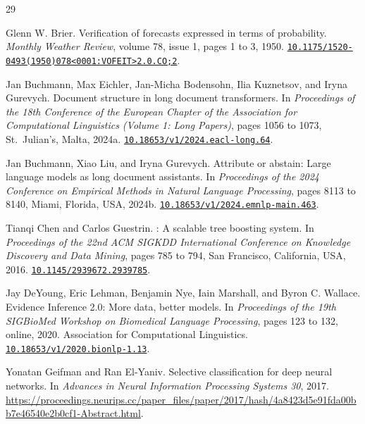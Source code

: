 \documentclass[11pt,letterpaper]{article}
\newcommand{\doi}[1]{\href{https://doi.org/#1}{\nolinkurl{#1}}}
\begin{document}
\begin{thebibliography}{29}
\providecommand{\natexlab}[1]{#1}

Glenn W. Brier.
\newblock Verification of forecasts expressed in terms of probability.
\newblock \emph{Monthly Weather Review}, volume 78, issue 1, pages 1 to 3, 1950.
\newblock \doi{10.1175/1520-0493(1950)078<0001:VOFEIT>2.0.CO;2}.

Jan Buchmann, Max Eichler, Jan-Micha Bodensohn, Ilia Kuznetsov, and Iryna Gurevych.
\newblock Document structure in long document transformers.
\newblock In \emph{Proceedings of the 18th Conference of the European Chapter of the Association for Computational Linguistics (Volume 1: Long Papers)}, pages 1056 to 1073, St.\ Julian's, Malta, 2024a.
\newblock \doi{10.18653/v1/2024.eacl-long.64}.

Jan Buchmann, Xiao Liu, and Iryna Gurevych.
\newblock Attribute or abstain: Large language models as long document assistants.
\newblock In \emph{Proceedings of the 2024 Conference on Empirical Methods in Natural Language Processing}, pages 8113 to 8140, Miami, Florida, USA, 2024b.
\newblock \doi{10.18653/v1/2024.emnlp-main.463}.

Tianqi Chen and Carlos Guestrin.
: A scalable tree boosting system.
\newblock In \emph{Proceedings of the 22nd ACM SIGKDD International Conference on Knowledge Discovery and Data Mining}, pages 785 to 794, San Francisco, California, USA, 2016.
\newblock \doi{10.1145/2939672.2939785}.

Jay DeYoung, Eric Lehman, Benjamin Nye, Iain Marshall, and Byron C. Wallace.
\newblock Evidence Inference 2.0: More data, better models.
\newblock In \emph{Proceedings of the 19th SIGBioMed Workshop on Biomedical Language Processing}, pages 123 to 132, online, 2020. Association for Computational Linguistics.
\newblock \doi{10.18653/v1/2020.bionlp-1.13}.

Yonatan Geifman and Ran El-Yaniv.
\newblock Selective classification for deep neural networks.
\newblock In \emph{Advances in Neural Information Processing Systems 30}, 2017.
\newblock \url{https://proceedings.neurips.cc/paper_files/paper/2017/hash/4a8423d5e91fda00bb7e46540e2b0cf1-Abstract.html}.


\end{thebibliography}
\end{document}

